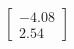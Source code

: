 \documentclass[preview]{standalone}
\begin{document}
\begin{align*}
\begin{bmatrix} -4.08 \\ 2.54 \end{bmatrix}
\end{align*}
\end{document}
